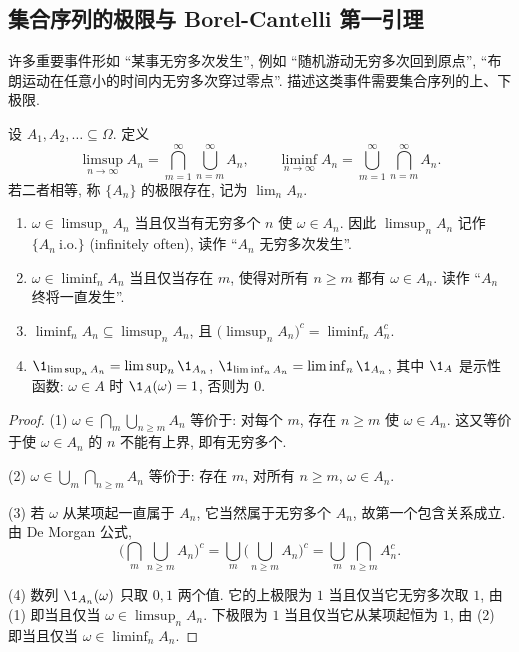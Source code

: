 \subsection{集合序列的极限与 Borel-Cantelli 第一引理}

许多重要事件形如 ``某事无穷多次发生'', 例如 ``随机游动无穷多次回到原点'', ``布朗运动在任意小的时间内无穷多次穿过零点''. 描述这类事件需要集合序列的上、下极限.

\begin{definition}\label{def:limsup-sets}
设 $A_1,A_2,\dots\subseteq\Omega$. 定义
\[
\limsup_{n\to\infty}A_n=\bigcap_{m=1}^\infty\bigcup_{n=m}^\infty A_n,\qquad
\liminf_{n\to\infty}A_n=\bigcup_{m=1}^\infty\bigcap_{n=m}^\infty A_n.
\]
若二者相等, 称 $\{A_n\}$ 的极限存在, 记为 $\lim_n A_n$.
\end{definition}

\begin{proposition}\label{prop:limsup-meaning}
\begin{enumerate}
\item $\omega\in\limsup_n A_n$ 当且仅当有无穷多个 $n$ 使 $\omega\in A_n$. 因此 $\limsup_n A_n$ 记作 $\{A_n\ \text{i.o.}\}$ (infinitely often), 读作 ``$A_n$ 无穷多次发生''.
\item $\omega\in\liminf_n A_n$ 当且仅当存在 $m$, 使得对所有 $n\ge m$ 都有 $\omega\in A_n$. 读作 ``$A_n$ 终将一直发生''.
\item $\liminf_n A_n\subseteq\limsup_n A_n$, 且 $\big(\limsup_n A_n\big)^c=\liminf_n A_n^c$.
\item $\1_{\limsup_n A_n}=\limsup_n\1_{A_n}$, $\1_{\liminf_n A_n}=\liminf_n\1_{A_n}$, 其中 $\1_A$ 是示性函数: $\omega\in A$ 时 $\1_A(\omega)=1$, 否则为 $0$.
\end{enumerate}
\end{proposition}

\begin{proof}
(1) $\omega\in\bigcap_m\bigcup_{n\ge m}A_n$ 等价于: 对每个 $m$, 存在 $n\ge m$ 使 $\omega\in A_n$. 这又等价于使 $\omega\in A_n$ 的 $n$ 不能有上界, 即有无穷多个.

(2) $\omega\in\bigcup_m\bigcap_{n\ge m}A_n$ 等价于: 存在 $m$, 对所有 $n\ge m$, $\omega\in A_n$.

(3) 若 $\omega$ 从某项起一直属于 $A_n$, 它当然属于无穷多个 $A_n$, 故第一个包含关系成立. 由 De Morgan 公式,
\[
\Big(\bigcap_{m}\bigcup_{n\ge m}A_n\Big)^c=\bigcup_m\Big(\bigcup_{n\ge m}A_n\Big)^c=\bigcup_m\bigcap_{n\ge m}A_n^c.
\]

(4) 数列 $\1_{A_n}(\omega)$ 只取 $0,1$ 两个值. 它的上极限为 $1$ 当且仅当它无穷多次取 $1$, 由 (1) 即当且仅当 $\omega\in\limsup_n A_n$. 下极限为 $1$ 当且仅当它从某项起恒为 $1$, 由 (2) 即当且仅当 $\omega\in\liminf_n A_n$.
\end{proof}

